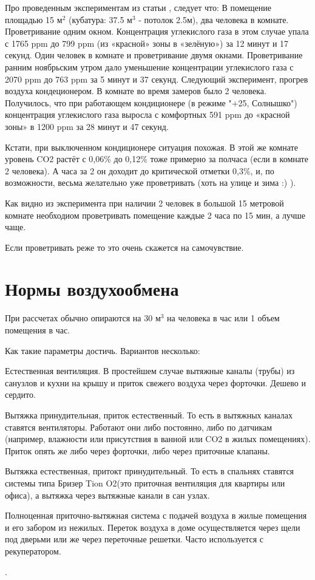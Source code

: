 \documentclass[10pt, twocolumn]{report}
\newenvironment{itemize*}%
{\begin{itemize}%
	\setlength{\itemsep}{1pt}%
	\setlength{\parskip}{1pt}}%
{\end{itemize}}
\begin{document}
Про проведенным экспериментам из статьи \cite{co2}, следует что:
В помещение площадью 15 $\text{м}^{2}$ (кубатура: 37.5 $\text{м}^3$ - потолок 2.5м), два человека в комнате. 
Проветривание одним окном. Концентрация углекислого газа в этом случае упала с 1765 ppm до 799 ppm (из «красной» зоны в «зелёную») за 12 минут и 17 секунд.
Один человек в комнате и проветривание двумя окнами. 
Проветривание ранним ноябрьским утром дало уменьшение концентрации углекислого газа с 2070 ppm до 763 ppm за 5 минут и 37 секунд.
Следующий эксперимент, прогрев воздуха кондеционером.
В комнате во время замеров было 2 человека. Получилось, что при работающем кондиционере (в режиме "+25, Солнышко") концентрация углекислого газа выросла с комфортных 591 ppm до «красной зоны» в 1200 ppm за 28 минут и 47 секунд.

Кстати, при выключенном кондиционере ситуация похожая. В этой же комнате уровень CO2 растёт с 0,06\% до 0,12\% тоже примерно за полчаса (если в комнате 2 человека). А часа за 2 он доходит до критической отметки 0,3\%, и, по возможности, весьма желательно уже проветривать (хоть на улице и зима :) ).

Как видно из эксперимента при наличии 2 человек в большой 15 метровой комнате необходиом проветривать помещение каждые 2 часа по 15 мин, а лучше чаще.

Если проветривать реже то это очень скажется на самочувствие.  

\section{Нормы воздухообмена}

При рассчетах обычно опираются на 30 $\text{м}^3$ на человека в час или 1 объем помещения в час.

Как такие параметры достичь. Вариантов несколько:

\begin{itemize*}
	\item Естественная вентиляция. В простейшем случае вытяжные каналы (трубы) из санузлов и кухни на крышу и приток свежего воздуха через форточки. Дешево и сердито.
	\item  Вытяжка принудительная, приток естественный. То есть в вытяжных каналах ставятся вентиляторы. Работают они либо постоянно, либо по датчикам (например, влажности или присутствия в ванной или CO2 в жилых помещениях). Приток опять же либо через форточки, либо через приточные клапаны.
	\item Вытяжка естественная, притокт принудительный.
	То есть в спальнях ставятся системы типа Бризер Tion O2(это приточная вентиляция для квартиры или офиса), а вытяжка через вытяжные канали в сан узлах.
	\item Полноценная приточно-вытяжная система с подачей воздуха в жилые помещения и его забором из нежилых. Переток воздуха в доме осуществляется через щели под дверьми или же через переточные решетки. Часто используется с рекуператором.
\end{itemize*}. 
\end{document}
